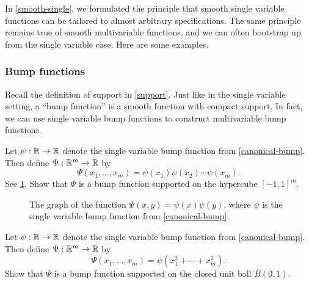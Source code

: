 In \cref{smooth-single}, we formulated the principle that smooth single variable functions can be tailored to almost arbitrary specifications. The same principle remains true of smooth multivariable functions, and we can often bootstrap up from the single variable case. Here are some examples. 

\subsubsection*{Bump functions}

Recall the definition of support in \cref{support}. Just like in the single variable setting, a ``bump function'' is a smooth function with compact support. In fact, we can use single variable bump functions to construct multivariable bump functions. 

\begin{exercise} \label{multivariable-bump-square-support}
	Let $\psi : \mathbb{R} \to \mathbb{R}$ denote the single variable bump function from \cref{canonical-bump}. Then define $\Psi : \mathbb{R}^m \to \mathbb{R}$ by
	\[ \Psi(x_1, \dotsc, x_m) = \psi(x_1) \psi(x_2) \dotsb \psi(x_m). \]
	See \cref{multivariable-bump-square-support-graph}. Show that $\Psi$ is a bump function supported on the hypercube $[-1,1]^m$. 
	\begin{figure}[ht]
		\begin{center}
		\end{center}
		\caption{The graph of the function  $\Psi(x,y) = \psi(x)\psi(y)$, where $\psi$ is the single variable bump function from \cref{canonical-bump}.} \label{multivariable-bump-square-support-graph}
	\end{figure}
\end{exercise}

\begin{exercise} \label{multivariable-bump-round-support}
	Let $\psi : \mathbb{R} \to \mathbb{R}$ denote the single variable bump function from \cref{canonical-bump}. Then define $\Psi : \mathbb{R}^m \to \mathbb{R}$ by
	\[ \Psi(x_1, \dotsc, x_m) = \psi(x_1^2 + \dotsb + x_m^2). \]
	Show that $\Psi$ is a bump function supported on the closed unit ball $\bar{B}(0,1)$.  
\end{exercise}

